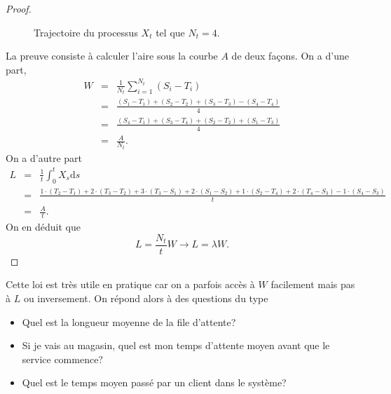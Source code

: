 \begin{proof}
\begin{figure}[ht!]
\begin{center}
\begin{tikzpicture}
\end{tikzpicture}
\end{center}
\caption{Trajectoire du processus $X_t$ tel que $N_t = 4$.}
\label{fig:queue_little}
\end{figure}
La preuve consiste à calculer l'aire sous la courbe $A$ de deux façons. On a d'une part,
\begin{eqnarray*}
W &=& \frac{1}{N_t}\sum_{i=1}^{N_t}(S_i - T_i)\\
&=& \frac{(S_1 - T_1) + (S_2 - T_2) + (S_3-T_3) - (S_4-T_4)}{4}\\
&=&\frac{(S_4 - T_1) + (S_3 - T_4) + (S_2-T_2) + (S_1-T_3)}{4}\\
&=&\frac{A}{N_t}.
\end{eqnarray*}
On a d'autre part
\begin{eqnarray*}
L &=& \frac{1}{t}\int_0^t X_s\text{d}s\\
&=&\frac{1\cdot(T_2-T_1) + 2\cdot(T_3-T_2) + 3\cdot(T_3-S_1)+ 2\cdot(S_1-S_2) + 1\cdot(S_2 - T_4) + 2\cdot(T_4 - S_3) - 1\cdot(S_4 - S_3)}{t}\\
&=&\frac{A}{t}.
\end{eqnarray*}
On en déduit que 
$$
L = \frac{N_t}{t}W\rightarrow L = \lambda W.
$$
\end{proof}
Cette loi est très utile en pratique car on a parfois accès à $W$ facilement mais pas à $L$ ou inversement. On répond alors à des questions du type 
\begin{itemize}
	\item Quel est la longueur moyenne de la file d'attente?
	\item Si je vais au magasin, quel est mon temps d'attente moyen avant que le service commence?
	\item Quel est le temps moyen passé par un client dans le système?
\end{itemize}
